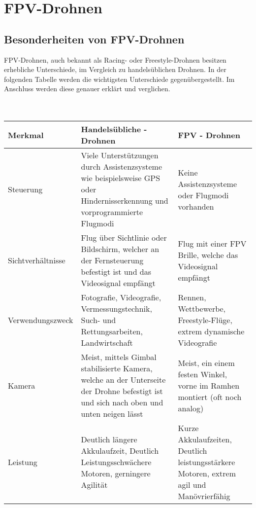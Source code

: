 \section[FPV-Drohnen]{FPV-Drohnen}
\subsection[Besonderheiten von FPV-Drohnen]{Besonderheiten von FPV-Drohnen}

FPV-Drohnen, auch bekannt als Racing- oder Freestyle-Drohnen besitzen erhebliche Unterschiede, im Vergleich zu handelsüblichen Drohnen. In der folgenden Tabelle werden die wichtigsten Unterschiede gegenübergestellt. Im Anschluss werden diese genauer erklärt und verglichen. 
\\ \\ \\
\renewcommand{\arraystretch}{1.5}
\begin{tabular}{p{3.2cm}p{6.4cm}p{6.4cm}}
    \toprule
    \textbf{Merkmal} & \textbf{Handelsübliche - Drohnen} & \textbf{FPV - Drohnen} \\
    \midrule
    Steuerung           & Viele Unterstützungen durch Assistenzsysteme wie beispielsweise GPS oder Hindernisserkennung und vorprogrammierte Flugmodi               & Keine Assistenzsysteme oder Flugmodi vorhanden \\
    Sichtverhältnisse   & Flug über Sichtlinie oder Bildschirm, welcher an der Fernsteuerung befestigt ist und das Videosignal empfängt                            & Flug mit einer FPV Brille, welche das Videosignal empfängt \\
    Verwendungszweck    & Fotografie, Videografie, Vermessungstechnik, Such- und Rettungsarbeiten, Landwirtschaft                                                  & Rennen, Wettbewerbe, Freestyle-Flüge, extrem dynamische Videografie \\
    Kamera              & Meist, mittels Gimbal stabilisierte Kamera, welche an der Unterseite der Drohne befestigt ist und sich nach oben und unten neigen lässt  & Meist, ein einem festen Winkel, vorne im Ramhen montiert (oft noch analog) \\
    Leistung            & Deutlich längere Akkulaufzeit, Deutlich Leistungsschwächere Motoren, gerningere Agilität                                                 & Kurze Akkulaufzeiten, Deutlich leistungsstärkere Motoren, extrem agil und Manövrierfähig \\
    \bottomrule
\end{tabular}







